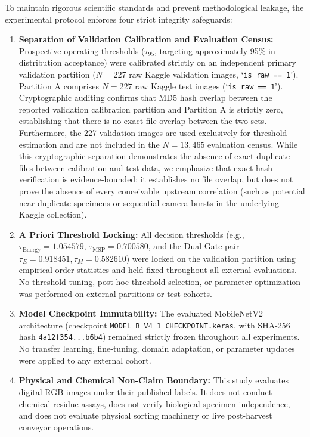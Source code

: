 To maintain rigorous scientific standards and prevent methodological leakage, the experimental protocol enforces four strict integrity safeguards:
\begin{enumerate}
\item \textbf{Separation of Validation Calibration and Evaluation Census:} Prospective operating thresholds ($\tau_{95}$, targeting approximately 95\% in-distribution acceptance) were calibrated strictly on an independent primary validation partition ($N = 227$ raw Kaggle validation images, `\texttt{is\_raw == 1}'). Partition A comprises $N = 227$ raw Kaggle test images (`\texttt{is\_raw == 1}'). Cryptographic auditing confirms that MD5 hash overlap between the reported validation calibration partition and Partition A is strictly zero, establishing that there is no exact-file overlap between the two sets. Furthermore, the 227 validation images are used exclusively for threshold estimation and are not included in the $N = 13,465$ evaluation census. While this cryptographic separation demonstrates the absence of exact duplicate files between calibration and test data, we emphasize that exact-hash verification is evidence-bounded: it establishes no file overlap, but does not prove the absence of every conceivable upstream correlation (such as potential near-duplicate specimens or sequential camera bursts in the underlying Kaggle collection).
\item \textbf{A Priori Threshold Locking:} All decision thresholds (e.g., $\tau_{\text{Energy}} = 1.054579$, $\tau_{\text{MSP}} = 0.700580$, and the Dual-Gate pair $\tau_E = 0.918451, \tau_M = 0.582610$) were locked on the validation partition using empirical order statistics and held fixed throughout all external evaluations. No threshold tuning, post-hoc threshold selection, or parameter optimization was performed on external partitions or test cohorts.
\item \textbf{Model Checkpoint Immutability:} The evaluated MobileNetV2 architecture (checkpoint {\small\nolinkurl{MODEL_B_V4_1_CHECKPOINT.keras}}, with SHA-256 hash \texttt{4a12f354...b6b4}) remained strictly frozen throughout all experiments. No transfer learning, fine-tuning, domain adaptation, or parameter updates were applied to any external cohort.
\item \textbf{Physical and Chemical Non-Claim Boundary:} This study evaluates digital RGB images under their published labels. It does not conduct chemical residue assays, does not verify biological specimen independence, and does not evaluate physical sorting machinery or live post-harvest conveyor operations.
\end{enumerate}

